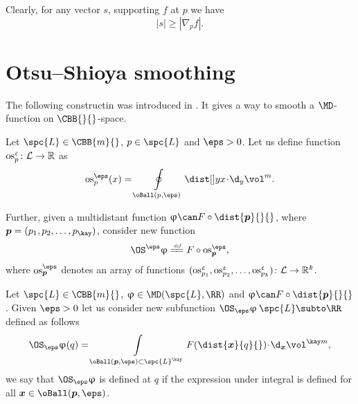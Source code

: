 Clearly, for any vector $s$, supporting  $f$ at $p$ we have 
\[|s|\ge|\nabla_p f|.\]














\section{Otsu--Shioya smoothing}

The following constructin was introduced in \cite[section 5]{otsu-shioya}.
It gives a way to smooth a $\MD$-function on $\CBB{}{}$-space.

Let $\spc{L}\in\CBB{m}{}$, $p\in\spc{L}$ and $\eps>0$.
Let us define function $\os_p^\eps\:\spc{L}\to\RR$ as 
\[\os_p^\eps(x)
=
\oint\limits_{\oBall(p,\eps)}
\dist[{{}}]{y}{x}{}\cdot\d_y\vol^m.\]

Further, 
given a multidistant function $\phi\can F\circ\dist{\bm{p}}{}{}$, where
$\bm{p}=(p_1,p_2,\dots,p_\kay)$,
consider new function
\[\OS^\eps\phi
\df
F\circ\os^\eps_{\bm{p}},
\]
where $\os^\eps_{\bm{p}}$ denotes an array of functions
$(\os^\eps_{p_1},\os^\eps_{p_2},\dots,\os^\eps_{p_\kay})\:\spc{L}\to\RR^\kay$.

Let $\spc{L}\in\CBB{m}{}$,
$\phi\in\MD(\spc{L},\RR)$
and $\phi\can F\circ\dist{\bm{p}}{}{}$.
Given $\eps>0$ let us consider new subfunction
$\OS_\eps\phi\:\spc{L}\subto\RR$ defined as follows 
\[\OS_\eps\phi(q)
=
\int\limits_{\oBall(\bm{p},\eps)\subset\spc{L}^\kay}
F(\dist{\bm{x}}{q}{})\cdot\d_{\bm{x}}\vol^{\kay m},\]
we say that $\OS_\eps\phi$ is defined at $q$ if the expression under integral is defined for all $\bm{x}\in \oBall(\bm{p},\eps)$.

